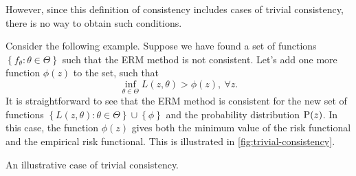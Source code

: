 However, since this definition of consistency includes cases of trivial consistency, there
is no way to obtain such conditions.

Consider the following example.  Suppose we have found a set of functions $\left\{ f_\theta
: \theta \in \Theta \right\}$ such that the ERM method is not consistent.  Let's add
one more function $\phi(z)$ to the set, such that
\begin{equation*}
  \inf_{\theta \in \Theta} L(z, \theta) > \phi(z),~\forall z\text{.}
\end{equation*}
It is straightforward to see that the ERM method is consistent for the new set of
functions $\left\{ L(z, \theta) : \theta \in \Theta \right\} \cup \left\{ \phi \right\}$
and the probability distribution $\operatorname{P}(z)$.  In this case, the function $\phi(z)$ gives both
the minimum value of the risk functional and the empirical risk functional.  This is
illustrated in \cref{fig:trivial-consistency}.

\begin{figurebox}[label=fig:trivial-consistency]{An illustrative case of trivial consistency.}
  \centering
\end{figurebox}

